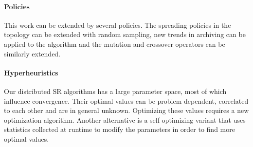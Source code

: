 \paragraph{Policies}
This work can be extended by several policies. The spreading policies in the topology can be extended with random sampling, new trends in archiving can be applied to the algorithm and the mutation and crossover operators can be similarly extended. 

\paragraph{Hyperheuristics}
Our distributed SR algorithms has a large parameter space, most of which influence convergence. Their optimal values can be problem dependent, correlated to each other and are in general unknown. Optimizing these values requires a new optimization algorithm. Another alternative is a self optimizing variant that uses statistics collected at runtime to modify the parameters in order to find more optimal values.